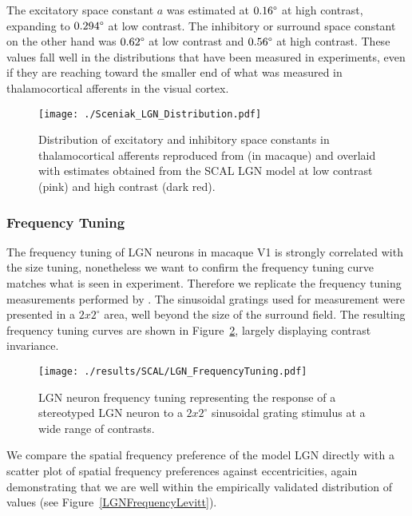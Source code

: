 The excitatory space constant $a$ was estimated at $0.16\degree$ at
high contrast, expanding to $0.294\degree$ at low contrast. The
inhibitory or surround space constant on the other hand was
$0.62\degree$ at low contrast and $0.56\degree$ at high contrast.
These values fall well in the distributions that have been measured in
experiments, even if they are reaching toward the smaller end of what
was measured in thalamocortical afferents in the visual cortex.

\begin{figure}
	\centering   \texttt{[image: ./Sceniak\_LGN\_Distribution.pdf]}
	\caption[Distribution of excitatory and inhibitory in
      thalamocortical afferents.]{Distribution of excitatory and
      inhibitory space constants in thalamocortical afferents
      reproduced from \cite{Sceniak2006} (in macaque) and overlaid
      with estimates obtained from the SCAL LGN model at low contrast
      (pink) and high contrast (dark red).}
	\label{LGNDistribution}
\end{figure}

\subsubsection*{Frequency Tuning}

The frequency tuning of LGN neurons in macaque V1 is strongly
correlated with the size tuning, nonetheless we want to confirm the
frequency tuning curve matches what is seen in experiment. Therefore
we replicate the frequency tuning measurements performed by
\cite{Levitt2001}. The sinusoidal gratings used for measurement were
presented in a $2x2^{\circ}$ area, well beyond the size of the
surround field. The resulting frequency tuning curves are shown in
Figure~\ref{LGNFrequencyTuning}, largely displaying contrast
invariance.

\begin{figure}
	\centering
    \texttt{[image: ./results/SCAL/LGN\_FrequencyTuning.pdf]}
	\caption{LGN neuron frequency tuning representing the response of
      a stereotyped LGN neuron to a $2x2^{\circ}$ sinusoidal grating
      stimulus at a wide range of contrasts.}
	\label{LGNFrequencyTuning}
\end{figure}

We compare the spatial frequency preference of the model LGN directly
with a scatter plot of spatial frequency preferences against
eccentricities, again demonstrating that we are well within the
empirically validated distribution of values (see
Figure~\ref{LGNFrequencyLevitt}).

